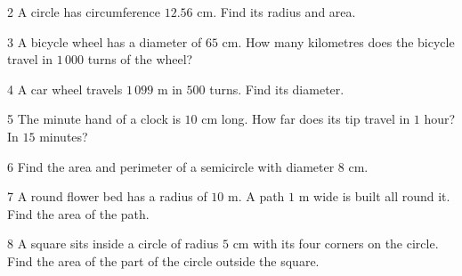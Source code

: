\gap
\begin{probbox}{2}{\relax}
A circle has circumference $12.56$ cm. Find its radius and area.
\end{probbox}
\gap
\begin{probbox}{3}{\relax}
A bicycle wheel has a diameter of $65$ cm. How many kilometres does the bicycle travel in $1\,000$ turns of the wheel?
\end{probbox}
\gap
\begin{probbox}{4}{\relax}
A car wheel travels $1\,099$ m in $500$ turns. Find its diameter.
\end{probbox}
\gap
\begin{probbox}{5}{\relax}
The minute hand of a clock is $10$ cm long. How far does its tip travel in $1$ hour? In $15$ minutes?
\end{probbox}
\gap
\begin{probbox}{6}{\relax}
Find the area and perimeter of a semicircle with diameter $8$ cm.
\end{probbox}
\gap
\begin{probbox}{7}{\relax}
A round flower bed has a radius of $10$ m. A path $1$ m wide is built all round it. Find the area of the path.
\end{probbox}
\gap
\begin{probbox}{8}{\relax}
A square sits inside a circle of radius $5$ cm with its four corners on the circle. Find the area of the part of the circle outside the square.
\end{probbox}

